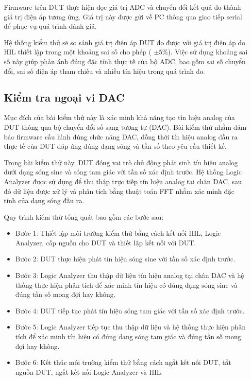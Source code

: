 Firmware trên DUT thực hiện đọc giá trị ADC và chuyển đổi kết quả đo thành giá trị điện áp tương ứng. Giá trị này được gửi về PC thông qua giao tiếp serial để phục vụ quá trình đánh giá.

Hệ thống kiểm thử sẽ so sánh giá trị điện áp DUT đo được với giá trị điện áp do HIL thiết lập trong một khoảng sai số cho phép ( $\pm 5\%$). Việc sử dụng khoảng sai số này giúp phản ánh đúng đặc tính thực tế của bộ ADC, bao gồm sai số chuyển đổi, sai số điện áp tham chiếu và nhiễu tín hiệu trong quá trình đo.

\subsection{Kiểm tra ngoại vi DAC}

Mục đích của bài kiểm thử này là xác minh khả năng tạo tín hiệu analog của DUT thông qua bộ chuyển đổi số sang tương tự (DAC). Bài kiểm thử nhằm đảm bảo firmware cấu hình đúng chức năng DAC, đồng thời tín hiệu analog đầu ra thực tế của DUT đáp ứng đúng dạng sóng và tần số theo yêu cầu thiết kế.

Trong bài kiểm thử này, DUT đóng vai trò chủ động phát sinh tín hiệu analog dưới dạng sóng sine và sóng tam giác với tần số xác định trước. Hệ thống Logic Analyzer được sử dụng để thu thập trực tiếp tín hiệu analog tại chân DAC, sau đó dữ liệu được xử lý và phân tích bằng thuật toán FFT nhằm xác minh đặc tính của dạng sóng đầu ra.

Quy trình kiểm thử tổng quát bao gồm các bước sau:

\begin{itemize}
    \item Bước 1: Thiết lập môi trường kiểm thử bằng cách kết nối HIL, Logic Analyzer, cấp nguồn cho DUT và thiết lập kết nối với DUT.
    \item Bước 2: DUT thực hiện phát tín hiệu sóng sine với tần số xác định trước.
    \item Bước 3: Logic Analyzer thu thập dữ liệu tín hiệu analog tại chân DAC và hệ thống thực hiện phân tích để xác minh tín hiệu có đúng dạng sóng sine và đúng tần số mong đợi hay không.
    \item Bước 4: DUT tiếp tục phát tín hiệu sóng tam giác với tần số xác định trước.
    \item Bước 5: Logic Analyzer tiếp tục thu thập dữ liệu và hệ thống thực hiện phân tích để xác minh tín hiệu có đúng dạng sóng tam giác và đúng tần số mong đợi hay không.
    \item Bước 6: Kết thúc môi trường kiểm thử bằng cách ngắt kết nối DUT, tắt nguồn DUT, ngắt kết nối Logic Analyzer và HIL.
\end{itemize}

